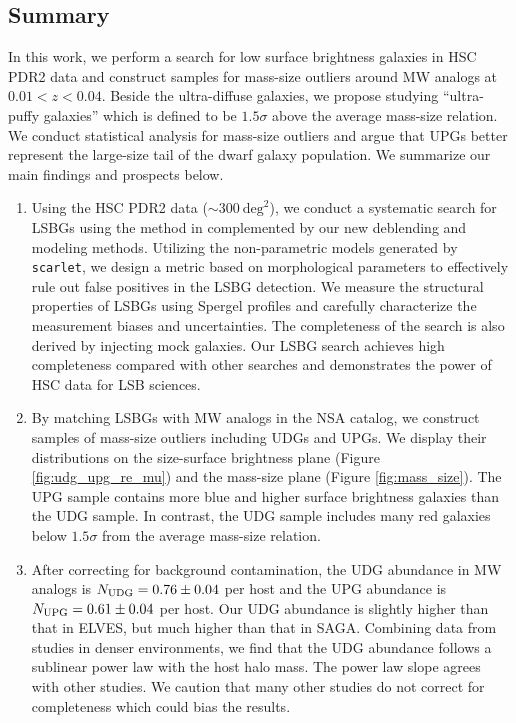 \documentclass[twocolumn,astrosymb,twocolappendix]{aastex631}
\newcommand{\code}[1]{\texttt{#1}}
\begin{document}
\begin{CJK*}{UTF8}{gbsn}
\section{Summary}\label{sec:summary}
In this work, we perform a search for low surface brightness galaxies in HSC PDR2 data and construct samples for mass-size outliers around MW analogs at $0.01 < z < 0.04$. Beside the ultra-diffuse galaxies, we propose studying ``ultra-puffy galaxies'' which is defined to be $1.5\sigma$ above the average mass-size relation. We conduct statistical analysis for mass-size outliers and argue that UPGs better represent the large-size tail of the dwarf galaxy population. We summarize our main findings and prospects below. 

\begin{enumerate}
    \item Using the HSC PDR2 data ($\sim 300\ \mathrm{deg}^{2}$), we conduct a systematic search for LSBGs using the method in \citet{Greco2018} complemented by our new deblending and modeling methods. Utilizing the non-parametric models generated by \code{scarlet}, we design a metric based on morphological parameters to effectively rule out false positives in the LSBG detection. We measure the structural properties of LSBGs using Spergel profiles and carefully characterize the measurement biases and uncertainties. The completeness of the search is also derived by injecting mock galaxies. Our LSBG search achieves high completeness compared with other searches and demonstrates the power of HSC data for LSB sciences. 
    
    \item By matching LSBGs with MW analogs in the NSA catalog, we construct samples of mass-size outliers including UDGs and UPGs. We display their distributions on the size-surface brightness plane (Figure \ref{fig:udg_upg_re_mu}) and the mass-size plane (Figure \ref{fig:mass_size}). The UPG sample contains more blue and higher surface brightness galaxies than the UDG sample. In contrast, the UDG sample includes many red galaxies below $1.5\sigma$ from the average mass-size relation.
    
    \item After correcting for background contamination, the UDG abundance in MW analogs is $N_{\rm UDG} = 0.76\pm 0.04$ per host and the UPG abundance is $N_{\rm UPG} = 0.61 \pm 0.04$ per host. Our UDG abundance is slightly higher than that in ELVES, but much higher than that in SAGA. Combining data from studies in denser environments, we find that the UDG abundance follows a sublinear power law with the host halo mass. The power law slope agrees with other studies. We caution that many other studies do not correct for completeness which could bias the results.
    

\end{enumerate}
\end{CJK*}
\end{document}
